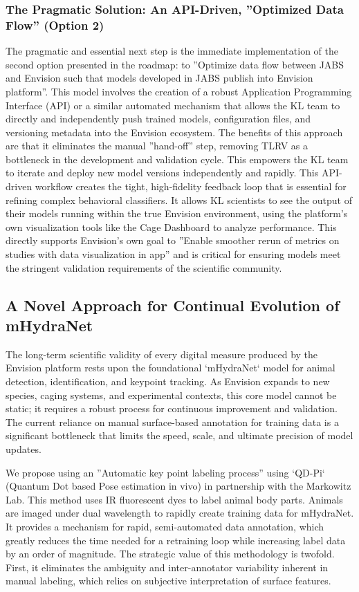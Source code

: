 \documentclass[11pt,a4paper]{article}
\begin{document}
\subsubsection{The Pragmatic Solution: An API-Driven, ”Optimized Data Flow” (Option 2)}

The pragmatic and essential next step is the immediate implementation of the second option presented in the roadmap: to ”Optimize data flow between JABS and Envision such that models developed in JABS publish into Envision platform”. This model involves the creation of a robust Application Programming Interface (API) or a similar automated mechanism that allows the KL team to directly and independently push trained models, configuration files, and versioning metadata into the Envision ecosystem. The benefits of this approach are that it eliminates the manual ”hand-off” step, removing TLRV as a bottleneck in the development and validation cycle. This empowers the KL team to iterate and deploy new model versions independently and rapidly. This API-driven workflow creates the tight, high-fidelity feedback loop that is essential for refining complex behavioral classifiers. It allows KL scientists to see the output of their models running within the true Envision environment, using the platform’s own visualization tools like the Cage Dashboard to analyze performance. This directly supports Envision’s own goal to ”Enable smoother rerun of metrics on studies with data visualization in app” and is critical for ensuring models meet the stringent validation requirements of the scientific community.

\subsection{A Novel Approach for Continual Evolution of mHydraNet}

The long-term scientific validity of every digital measure produced by the Envision platform rests upon the foundational ‘mHydraNet‘ model for animal detection, identification, and keypoint tracking. As Envision expands to new species, caging systems, and experimental contexts, this core model cannot be static; it requires a robust process for continuous improvement and validation. The current reliance on manual surface-based annotation for training data is a significant bottleneck that limits the speed, scale, and ultimate precision of model updates.

We propose using an ”Automatic key point labeling process” using ‘QD-Pi‘ (Quantum Dot based Pose estimation in vivo) in partnership with the Markowitz Lab. This method uses IR fluorescent dyes to label animal body parts. Animals are imaged under dual wavelength to rapidly create training data for mHydraNet. It provides a mechanism for rapid, semi-automated data annotation, which greatly reduces the time needed for a retraining loop while increasing label data by an order of magnitude. The strategic value of this methodology is twofold. First, it eliminates the ambiguity and inter-annotator variability inherent in manual labeling, which relies on subjective interpretation of surface features.
\end{document}
